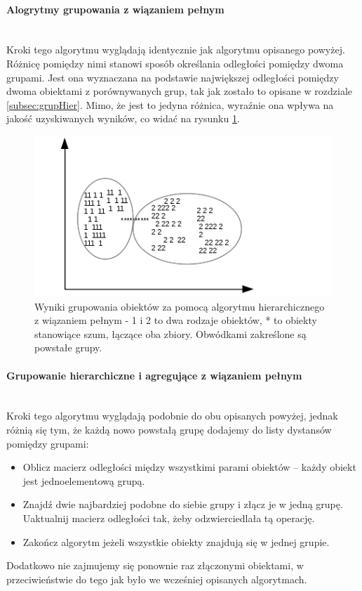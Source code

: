 \documentclass{article}
\newcommand{\myparagraph}[1]{\paragraph{#1}\mbox{}\\}
\begin{document}
\myparagraph{Alogrytmy grupowania z wiązaniem pełnym}

Kroki tego algorytmu wyglądają identycznie jak algorytmu opisanego powyżej. Różnicę pomiędzy nimi stanowi sposób określania odległości pomiędzy dwoma grupami. Jest ona wyznaczana na podstawie największej odległości pomiędzy dwoma obiektami z porównywanych grup, tak jak zostało to opisane w rozdziale \ref{subsec:grupHier}. Mimo, że jest to jedyna różnica, wyraźnie ona wpływa na jakość uzyskiwanych wyników, co widać na rysunku \ref{fig:grupHChain}.

\begin{figure}[H] 
	\centering
	\includegraphics[scale=0.9]{grupHChain.png}
	\caption{Wyniki grupowania obiektów za pomocą algorytmu hierarchicznego z wiązaniem pełnym - 1 i 2 to dwa rodzaje obiektów, * to obiekty stanowiące szum, łączące oba zbiory. Obwódkami zakreślone są powstałe grupy.}
	\label{fig:grupHChain}
\end{figure}

\myparagraph{Grupowanie hierarchiczne i agregujące z wiązaniem pełnym}

Kroki tego algorytmu wyglądają podobnie do obu opisanych powyżej, jednak różnią się tym, że każdą nowo powstałą grupę dodajemy do listy dystansów pomiędzy grupami:
\begin{itemize}
	\item Oblicz macierz odległości między wszystkimi parami obiektów – każdy obiekt jest jednoelementową grupą.
	\item Znajdź dwie najbardziej podobne do siebie grupy i złącz je w jedną grupę. Uaktualnij macierz odległości tak, żeby odzwierciedlała tą operację.
	\item Zakończ algorytm jeżeli wszystkie obiekty znajdują się w jednej grupie.
\end{itemize}

Dodatkowo nie zajmujemy się ponownie raz złączonymi obiektami, w przeciwieństwie do tego jak było we wcześniej opisanych algorytmach.
\end{document}
